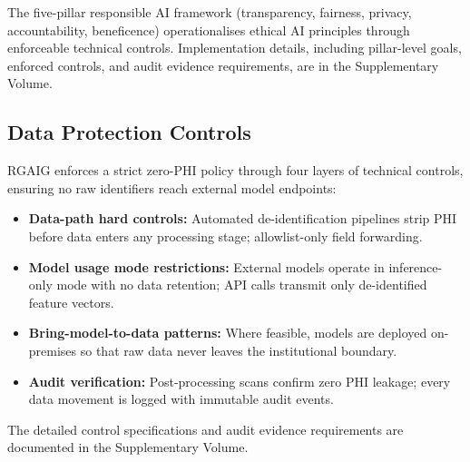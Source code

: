 \label{sec:rai_five_pillars}


The five-pillar responsible AI framework (transparency, fairness, privacy, accountability, beneficence) operationalises ethical AI principles through enforceable technical controls. Implementation details, including pillar-level goals, enforced controls, and audit evidence requirements, are in the Supplementary Volume.


\subsection{Data Protection Controls}
\label{sec:data_protection_controls}


RGAIG enforces a strict zero-PHI policy through four layers of technical controls, ensuring no raw identifiers reach external model endpoints:

\begin{itemize}[leftmargin=*, itemsep=3pt]
    \item \textbf{Data-path hard controls:} Automated de-identification pipelines strip PHI before data enters any processing stage; allowlist-only field forwarding.
    \item \textbf{Model usage mode restrictions:} External models operate in inference-only mode with no data retention; API calls transmit only de-identified feature vectors.
    \item \textbf{Bring-model-to-data patterns:} Where feasible, models are deployed on-premises so that raw data never leaves the institutional boundary.
    \item \textbf{Audit verification:} Post-processing scans confirm zero PHI leakage; every data movement is logged with immutable audit events.
\end{itemize}

\noindent The detailed control specifications and audit evidence requirements are documented in the Supplementary Volume.


